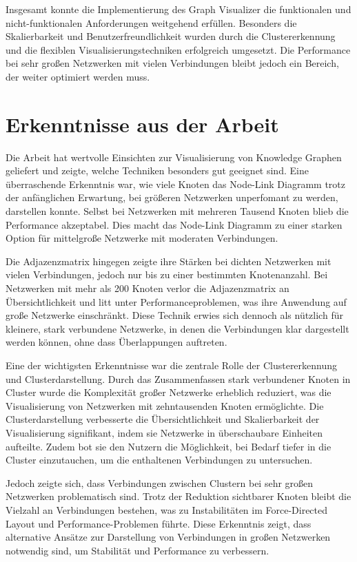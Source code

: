 Insgesamt konnte die Implementierung des Graph Visualizer die funktionalen und nicht-funktionalen Anforderungen weitgehend erfüllen. Besonders die Skalierbarkeit und Benutzerfreundlichkeit wurden durch die Clustererkennung und die flexiblen Visualisierungstechniken erfolgreich umgesetzt. Die Performance bei sehr großen Netzwerken mit vielen Verbindungen bleibt jedoch ein Bereich, der weiter optimiert werden muss.

\section{Erkenntnisse aus der Arbeit}

Die Arbeit hat wertvolle Einsichten zur Visualisierung von Knowledge Graphen geliefert und zeigte, welche Techniken besonders gut geeignet sind. Eine überraschende Erkenntnis war, wie viele Knoten das Node-Link Diagramm trotz der anfänglichen Erwartung, bei größeren Netzwerken unperfomant zu werden, darstellen konnte. Selbst bei Netzwerken mit mehreren Tausend Knoten blieb die Performance akzeptabel. Dies macht das Node-Link Diagramm zu einer starken Option für mittelgroße Netzwerke mit moderaten Verbindungen.

Die Adjazenzmatrix hingegen zeigte ihre Stärken bei dichten Netzwerken mit vielen Verbindungen, jedoch nur bis zu einer bestimmten Knotenanzahl. Bei Netzwerken mit mehr als 200 Knoten verlor die Adjazenzmatrix an Übersichtlichkeit und litt unter Performanceproblemen, was ihre Anwendung auf große Netzwerke einschränkt. Diese Technik erwies sich dennoch als nützlich für kleinere, stark verbundene Netzwerke, in denen die Verbindungen klar dargestellt werden können, ohne dass Überlappungen auftreten.

Eine der wichtigsten Erkenntnisse war die zentrale Rolle der Clustererkennung und Clusterdarstellung. Durch das Zusammenfassen stark verbundener Knoten in Cluster wurde die Komplexität großer Netzwerke erheblich reduziert, was die Visualisierung von Netzwerken mit zehntausenden Knoten ermöglichte. Die Clusterdarstellung verbesserte die Übersichtlichkeit und Skalierbarkeit der Visualisierung signifikant, indem sie Netzwerke in überschaubare Einheiten aufteilte. Zudem bot sie den Nutzern die Möglichkeit, bei Bedarf tiefer in die Cluster einzutauchen, um die enthaltenen Verbindungen zu untersuchen.

Jedoch zeigte sich, dass Verbindungen zwischen Clustern bei sehr großen Netzwerken problematisch sind. Trotz der Reduktion sichtbarer Knoten bleibt die Vielzahl an Verbindungen bestehen, was zu Instabilitäten im Force-Directed Layout und Performance-Problemen führte. Diese Erkenntnis zeigt, dass alternative Ansätze zur Darstellung von Verbindungen in großen Netzwerken notwendig sind, um Stabilität und Performance zu verbessern.

